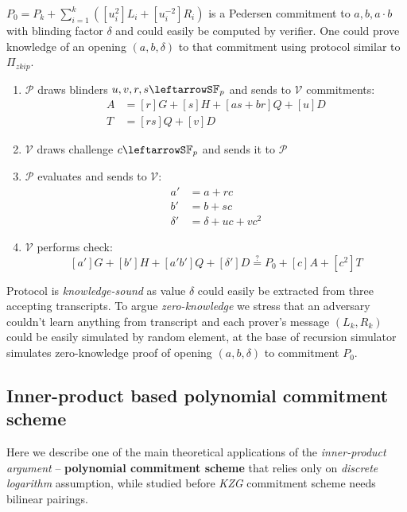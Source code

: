 \documentclass[../lecture-notes-148x210.tex]{subfiles}
\begin{document}
$P_0 = P_k + \sum_{i=1}^k ([u_i^2]L_i + [u_i^{-2}]R_i)$ is a Pedersen commitment to $a, b, a \cdot b$ with blinding factor $\delta$ and could easily be computed by verifier. One could prove knowledge of an opening $(a,b,\delta)$ to that commitment using protocol similar to $\Pi_{zkip}$.
\begin{enumerate}
    \item $\mathcal{P}$ draws blinders $u,v,r,s \leftarrowS \mathbb{F}_p$ and sends to $\mathcal{V}$ commitments:
    \begin{align*}
        A &= [r]G + [s]H + [as + br]Q + [u]D \\
        T &= [rs]Q + [v]D
    \end{align*}
    \item $\mathcal{V}$ draws challenge $c \leftarrowS \mathbb{F}_p$ and sends it to $\mathcal{P}$
    \item $\mathcal{P}$ evaluates and sends to $\mathcal{V}$:
    \begin{align*}
        a' &= a + rc \\
        b' &= b + sc \\
        \delta' &= \delta + uc + vc^2
    \end{align*}
    \item $\mathcal{V}$ performs check:
    $$[a']G + [b']H + [a'b']Q + [\delta']D \stackrel{\text{?}}{=} P_0 + [c]A + [c^2]T$$
\end{enumerate}

Protocol is \textit{knowledge-sound} as value $\delta$ could easily be extracted from three accepting transcripts. To argue \textit{zero-knowledge} we stress that an adversary couldn't learn anything from transcript and each prover's message $(L_k, R_k)$ could be easily simulated by random element, at the base of recursion simulator simulates zero-knowledge proof of opening $(a,b,\delta)$ to commitment $P_0$.
\subsection{Inner-product based polynomial commitment scheme}

Here we describe one of the main theoretical applications of the \textit{inner-product argument} -- \textbf{polynomial commitment scheme} that relies only on \textit{discrete logarithm} assumption, while studied before \textit{KZG} commitment scheme needs bilinear pairings. 
\end{document}

